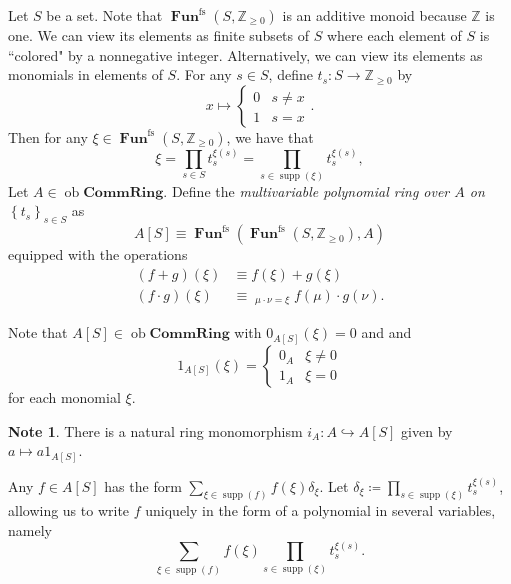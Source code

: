 \documentclass[10pt,letterpaper,cm]{nupset}
\theoremstyle{definition}
\newtheorem{note}[definition]{Note}
\theoremstyle{theorem}
\theoremstyle{remark}
\newcommand{\Z}{\mathbb Z}
\newcommand{\1}{\mathbf{1}}
\newcommand{\0}{\vec 0}
\DeclareMathOperator{\ob}{ob}
\DeclareMathOperator{\fs}{fs}
\DeclareMathOperator{\Fun}{\mathbf{Fun}}
\DeclareMathOperator{\supp}{supp}
\begin{document}
Let $S$ be a set. Note that $\Fun^{\fs}(S, \Z_{\geq 0})$ is an additive monoid because $\Z$ is one. We can view its elements as finite subsets of $S$ where each element of $S$ is ``colored" by a nonnegative integer. Alternatively, we can view its elements as monomials in elements of $S$. For any $s\in S$, define $t_s : S \to \Z_{\geq 0}$ by $$x \mapsto \begin{cases} 0 & s \ne x \\ 1 & s =x \end{cases}.$$ Then for any $\xi \in \Fun^{\fs}(S, \Z_{\geq 0})$, we have that $$\xi = \prod_{s\in S}t_s^{\xi(s)} =\prod_{s\in \supp(\xi)}t_s^{\xi(s)},$$
Let $A \in \ob \mathbf{CommRing}$. Define the \textit{multivariable polynomial ring over $A$ on $\left\{t_s\right\}_{s\in S}$} as $$A\left[S\right] \equiv \Fun^{\fs}(\Fun^{\fs}(S, \Z_{\geq 0}), A)$$ equipped with the operations
\begin{align*}
(f+g)(\xi) & \equiv f(\xi) +g(\xi)
\\ (f\cdot g)(\xi) & \equiv \mathop{\sum_{\mu, \nu}}_{\mu \cdot \nu = \xi} f(\mu) \cdot g(\nu).
\end{align*}

Note that $A\left[S\right] \in  \ob \mathbf{CommRing}$ with $0_{A\left[S\right]}(\xi) =0$ and and $$1_{A\left[S\right]}(\xi) = \begin{cases} 0_A & \xi \ne 0 \\ 1_A & \xi =0   \end{cases}$$ for each monomial $\xi$. 

\begin{note}
There is  a natural ring monomorphism $i_A : A \hookrightarrow A\left[S\right]$ given by $a \mapsto a1_{A\left[S\right]}$.
\end{note}

Any $f\in A\left[S\right]$ has the form $\sum_{\xi \in \supp(f)} f(\xi)\delta_{\xi}$. Let $ \delta_{\xi}\coloneqq \prod_{s\in \supp(\xi)}t_s^{\xi(s)}$, allowing us to write $f$ uniquely in the form of a polynomial in several variables, namely
\[
\sum_{\xi \in \supp(f)} f(\xi)\prod_{s\in \supp(\xi)}t_s^{\xi(s)}
.\]
\end{document}
